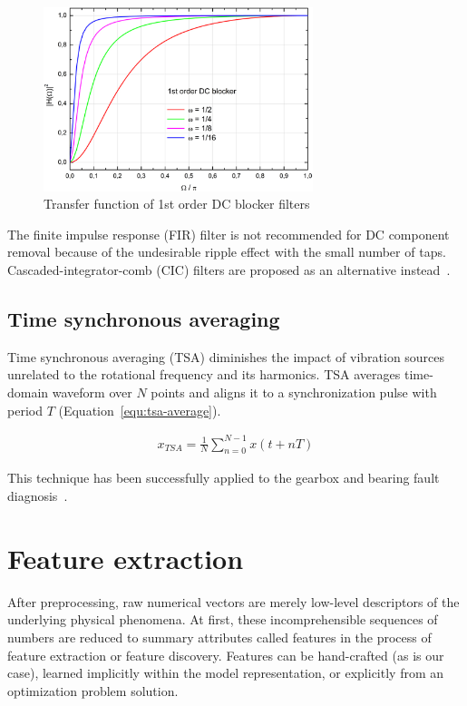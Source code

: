 \begin{figure}[h]
	\centering
	\includegraphics[width=0.7\textwidth]{assets/analysis/iir-1-dc-blocker-band.jpg}
	\caption{Transfer function of 1st order DC blocker filters ~\cite{tittelbach-helmrich_digital_2021}}
	\label{fig:dc-blocker}
\end{figure}

The finite impulse response (FIR) filter is not recommended for DC component removal because of the undesirable ripple effect with the small number of taps. Cascaded-integrator-comb (CIC) filters are proposed as an alternative instead~\cite{lyons_understanding_2011}.

\subsection{Time synchronous averaging}
Time synchronous averaging (TSA) diminishes the impact of vibration sources unrelated to the rotational frequency and its harmonics. TSA averages time-domain waveform over $N$ points and aligns it to a synchronization pulse with period $T$ (Equation~\ref{equ:tsa-average}). 

\begin{ceqn}\begin{align}
x_{TSA} = \frac{1}{N} \sum_{n = 0}^{N - 1}{x(t + nT)}
\label{equ:tsa-average}
\end{align}\end{ceqn} 

This technique has been successfully applied to the gearbox and bearing fault diagnosis~\cite{davies_handbook_2012,nandi_condition_2019}.

\section{Feature extraction} \label{section:feature-extraction}
After preprocessing, raw numerical vectors are merely low-level descriptors of the underlying physical phenomena. At first, these incomprehensible sequences of numbers are reduced to summary attributes called features in the process of feature extraction or feature discovery. Features can be hand-crafted (as is our case), learned implicitly within the model representation, or explicitly from an optimization problem solution. 

